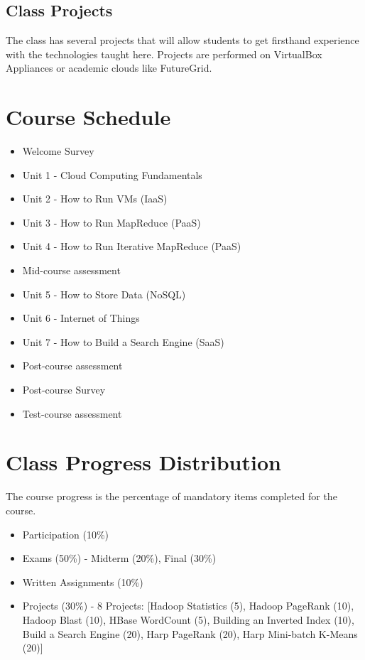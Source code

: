 \subsection{Class Projects}
The class has several projects that will allow students to get firsthand
experience with the technologies taught here. Projects are performed on
VirtualBox Appliances or academic clouds like FutureGrid.

\section{Course Schedule}
\begin{itemize}
  \item Welcome Survey
  \item Unit 1 - Cloud Computing Fundamentals
  \item Unit 2 - How to Run VMs (IaaS)
  \item Unit 3 - How to Run MapReduce (PaaS)
  \item Unit 4 - How to Run Iterative MapReduce (PaaS)
  \item Mid-course assessment
  \item Unit 5 - How to Store Data (NoSQL)
  \item Unit 6 - Internet of Things
  \item Unit 7 - How to Build a Search Engine (SaaS)
  \item Post-course assessment
  \item Post-course Survey
  \item Test-course assessment
\end{itemize}

\section{Class Progress Distribution}

The course progress is the percentage of mandatory items completed for the course.

\begin{itemize}
  \item Participation (10\%)
  \item Exams (50\%) - Midterm (20\%), Final (30\%)
  \item Written Assignments (10\%)
  \item Projects (30\%) - 8 Projects: [Hadoop Statistics (5), Hadoop PageRank (10), Hadoop Blast (10), HBase WordCount (5), Building an Inverted Index (10), Build a Search Engine (20), Harp PageRank (20), Harp Mini-batch K-Means (20)]
\end{itemize}

